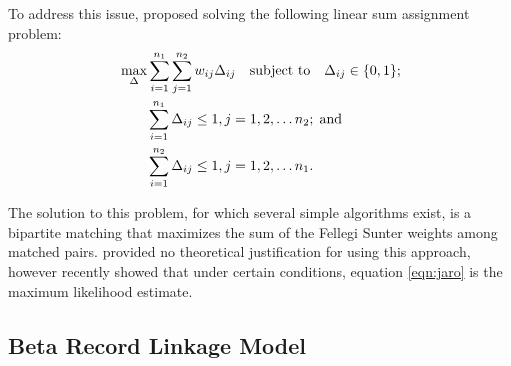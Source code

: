 \documentclass[12pt,letterpaper]{article}
\newcommand{\1}[1]{\mathbb{I}\!\left[#1\right]} %
\begin{document}
{To address this issue, \cite{jaro1989} proposed solving the following linear sum assignment problem:
\begin{align}
	\label{eqn:jaro}
	&\max_{\Delta} \sum_{i=1}^{n_1} \sum_{j=1}^{n_2} w_{ij} \Delta_{ij} 
	\quad \text{subject to} \quad \Delta_{ij} \in \{0,1\}; \\
	& \quad \quad \sum_{i=1}^{n_1}  \Delta_{ij}  \leq 1, j=1,2, \ldots n_2; \; \text{and} \notag\\
	& \quad \quad\sum_{i=1}^{n_2}  \Delta_{ij}  \leq 1, j=1,2, \ldots n_1. \notag
\end{align}

The solution to this problem, for which several simple algorithms exist, is a bipartite matching that maximizes the sum of the Fellegi Sunter weights among matched pairs. \cite{jaro1989} provided no theoretical justification for using this approach, however \cite{sadinle_bayesian_2017} recently showed that under certain conditions, equation \ref{eqn:jaro} is the maximum likelihood estimate. 


\subsection{Beta Record Linkage Model}

}
\end{document}
